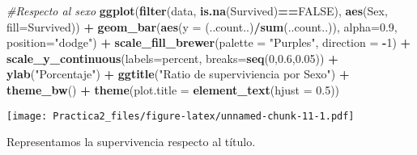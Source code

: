 \documentclass[]{article}
\newenvironment{Shaded}{\begin{snugshade}}{\end{snugshade}}
\newcommand{\KeywordTok}[1]{\textcolor[rgb]{0.13,0.29,0.53}{\textbf{#1}}}
\newcommand{\DataTypeTok}[1]{\textcolor[rgb]{0.13,0.29,0.53}{#1}}
\newcommand{\DecValTok}[1]{\textcolor[rgb]{0.00,0.00,0.81}{#1}}
\newcommand{\FloatTok}[1]{\textcolor[rgb]{0.00,0.00,0.81}{#1}}
\newcommand{\StringTok}[1]{\textcolor[rgb]{0.31,0.60,0.02}{#1}}
\newcommand{\CommentTok}[1]{\textcolor[rgb]{0.56,0.35,0.01}{\textit{#1}}}
\newcommand{\OtherTok}[1]{\textcolor[rgb]{0.56,0.35,0.01}{#1}}
\newcommand{\OperatorTok}[1]{\textcolor[rgb]{0.81,0.36,0.00}{\textbf{#1}}}
\newcommand{\NormalTok}[1]{#1}
\begin{document}
\begin{Shaded}
\begin{Highlighting}[]
\CommentTok{#Respecto al sexo}
\KeywordTok{ggplot}\NormalTok{(}\KeywordTok{filter}\NormalTok{(data, }\KeywordTok{is.na}\NormalTok{(Survived)}\OperatorTok{==}\OtherTok{FALSE}\NormalTok{), }\KeywordTok{aes}\NormalTok{(Sex, }\DataTypeTok{fill=}\NormalTok{Survived)) }\OperatorTok{+}\StringTok{ }
\StringTok{  }\KeywordTok{geom_bar}\NormalTok{(}\KeywordTok{aes}\NormalTok{(}\DataTypeTok{y =}\NormalTok{ (..count..)}\OperatorTok{/}\KeywordTok{sum}\NormalTok{(..count..)), }\DataTypeTok{alpha=}\FloatTok{0.9}\NormalTok{, }\DataTypeTok{position=}\StringTok{"dodge"}\NormalTok{) }\OperatorTok{+}
\StringTok{  }\KeywordTok{scale_fill_brewer}\NormalTok{(}\DataTypeTok{palette =} \StringTok{"Purples"}\NormalTok{, }\DataTypeTok{direction =} \OperatorTok{-}\DecValTok{1}\NormalTok{) }\OperatorTok{+}
\StringTok{  }\KeywordTok{scale_y_continuous}\NormalTok{(}\DataTypeTok{labels=}\NormalTok{percent, }\DataTypeTok{breaks=}\KeywordTok{seq}\NormalTok{(}\DecValTok{0}\NormalTok{,}\FloatTok{0.6}\NormalTok{,}\FloatTok{0.05}\NormalTok{)) }\OperatorTok{+}
\StringTok{  }\KeywordTok{ylab}\NormalTok{(}\StringTok{"Porcentaje"}\NormalTok{) }\OperatorTok{+}\StringTok{ }
\StringTok{  }\KeywordTok{ggtitle}\NormalTok{(}\StringTok{"Ratio de superviviencia por Sexo"}\NormalTok{) }\OperatorTok{+}
\StringTok{  }\KeywordTok{theme_bw}\NormalTok{() }\OperatorTok{+}
\StringTok{  }\KeywordTok{theme}\NormalTok{(}\DataTypeTok{plot.title =} \KeywordTok{element_text}\NormalTok{(}\DataTypeTok{hjust =} \FloatTok{0.5}\NormalTok{))}
\end{Highlighting}
\end{Shaded}

\texttt{[image: Practica2\_files/figure-latex/unnamed-chunk-11-1.pdf]}

Representamos la supervivencia respecto al título.
\end{document}
